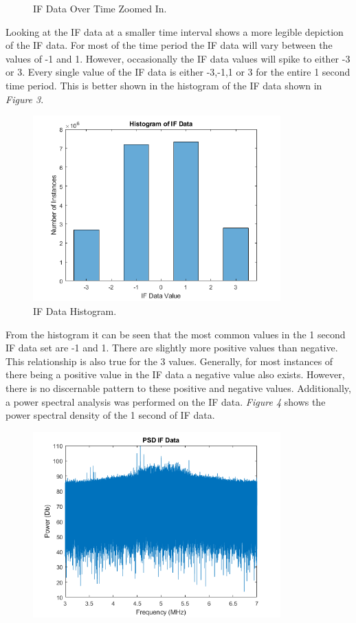 \documentclass[11pt]{article}
\begin{document}
\begin{enumerate}[label=\textbf{\arabic*.}]
\begin{figure}[H]
        \caption{IF Data Over Time Zoomed In.}
    \end{figure}
 Looking at the IF data at a smaller time interval shows a more legible depiction of the IF data. For most of the time period the IF data will vary between the values of -1 and 1. However, occasionally the IF data values will spike to either -3 or 3. Every single value of the IF data is either -3,-1,1 or 3 for the entire 1 second time period. This is better shown in the histogram of the IF data shown in \emph{Figure 3}. 
    \begin{figure}[H]
        \centering
        \includegraphics[width=0.85\textwidth]{Lab_4_IFEN_Hist.png}
        \caption{IF Data Histogram.}
    \end{figure}
From the histogram it can be seen that the most common values in the 1 second IF data set are -1 and 1. There are slightly more positive values than negative. This relationship is also true for the 3 values. Generally, for most instances of there being a positive value in the IF data a negative value also exists. However, there is no discernable pattern to these positive and negative values. Additionally, a power spectral analysis was performed on the IF data. \emph{Figure 4} shows the power spectral density of the 1 second of IF data.
    \begin{figure}[H]
        \centering
        \includegraphics[width=0.85\textwidth]{Lab_4_IFEN_PSD.png}

\end{figure}
\end{enumerate}
\end{document}
